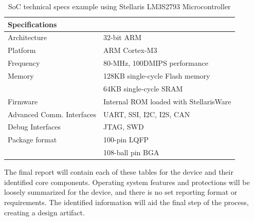 \begin{table}[H]
  \centering
  \begin{tabular}{|p{6cm}|p{9cm}|}
    \hline\rowcolor{gray!30}

    \textbf{Specifications} &  \\
    \hline

    Architecture & 32-bit ARM \\
    \hline

    Platform & ARM Cortex-M3 \\
    \hline

    Frequency & 80-MHz, 100DMIPS performance \\
    \hline

    Memory & 128KB single-cycle Flash memory \\
     & 64KB single-cycle SRAM \\
    \hline

    Firmware & Internal ROM loaded with StellarisWare \\
    \hline

    Advanced Comm. Interfaces & UART, SSI, I2C, I2S, CAN \\
    \hline

    Debug Interfaces & JTAG, SWD \\
    \hline

    Package format & 100-pin LQFP \\
    & 108-ball pin BGA \\
    \hline

  \end{tabular}
  \caption{SoC technical specs example using Stellaris LM3S2793 Microcontroller}
  \label{fig:soc_specs}%
\end{table}

The final report will contain each of these tables for the device and their identified core components. Operating system features and protections will be loosely summarized for the device,  and there is no set reporting format or requirements. The identified information will aid the final step of the process, creating a design artifact.

